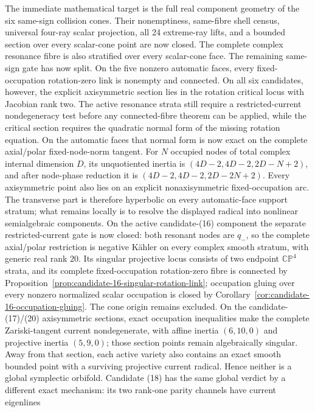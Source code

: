 \documentclass[11pt]{article}
\theoremstyle{definition}
\theoremstyle{remark}
\begin{document}
The immediate mathematical target is the full real component geometry of the
six same-sign collision cones.  Their nonemptiness, same-fibre shell census,
universal four-ray scalar projection, all 24 extreme-ray lifts, and a bounded
section over every scalar-cone point are now closed.  The complete complex
resonance fibre is also stratified over every scalar-cone face.  The remaining
same-sign gate has now split.  On the five nonzero automatic faces, every
fixed-occupation rotation-zero link is nonempty and connected.  On all six
candidates, however, the explicit axisymmetric section lies in the rotation
critical locus with Jacobian rank two.  The active resonance strata still
require a restricted-current nondegeneracy test before any connected-fibre
theorem can be applied, while the critical section requires the quadratic
normal form of the missing rotation equation.  On the automatic faces that
normal form is now exact on the complete axial/polar fixed-node-norm tangent.
For \(N\) occupied nodes of total complex internal dimension \(D\), its
unquotiented inertia is \((4D-2,4D-2,2D-N+2)\), and after node-phase
reduction it is \((4D-2,4D-2,2D-2N+2)\).  Every axisymmetric point also
lies on an explicit nonaxisymmetric fixed-occupation arc.  The transverse
part is therefore hyperbolic on every automatic-face support stratum; what
remains locally is to resolve the displayed radical into nonlinear
semialgebraic components.  On the active candidate-(16) component the
separate restricted-current gate is now closed: both resonant nodes are
\(q_-\), so the complete axial/polar restriction is negative K\"ahler on
every complex smooth stratum, with generic real rank \(20\).  Its singular
projective locus consists of two endpoint \(\mathbb{CP}^4\) strata, and its
complete fixed-occupation rotation-zero fibre is connected by
Proposition~\ref{prop:candidate-16-singular-rotation-link}; occupation gluing
over every nonzero normalized scalar occupation is closed by
Corollary~\ref{cor:candidate-16-occupation-gluing}.  The cone origin remains
excluded.  On the
candidate-(17)/(20) axisymmetric
sections, exact occupation inequalities make the complete Zariski-tangent
current nondegenerate, with affine inertia \((6,10,0)\) and projective inertia
\((5,9,0)\); those section points remain algebraically singular.  Away from
that section, each active variety also contains an exact smooth bounded point
with a surviving projective current radical.  Hence neither is a global
symplectic orbifold.  Candidate (18) has the same global verdict by a different exact
mechanism: its two rank-one parity channels have current eigenlines
\end{document}
